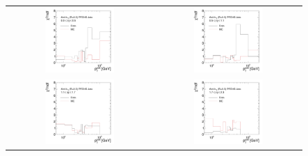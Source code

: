 \begin{figure}[!htp]
  \centering
  \begin{tabular}{cc}
                \includegraphics[width=0.49\textwidth]{figures/GoodnessOfFit_Eta0_final_nominal_v4.pdf} &
                \includegraphics[width=0.49\textwidth]{figures/GoodnessOfFit_Eta1_final_nominal_v4.pdf} \\
                \includegraphics[width=0.49\textwidth]{figures/GoodnessOfFit_Eta2_final_nominal_v4.pdf} &
                \includegraphics[width=0.49\textwidth]{figures/GoodnessOfFit_Eta3_final_nominal_v4.pdf} \\

\end{tabular}
\end{figure}
